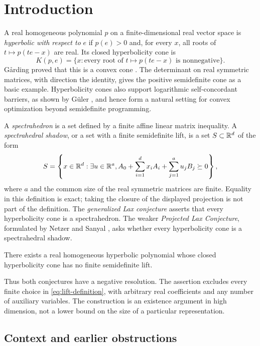\section{Introduction}

A real homogeneous polynomial $p$ on a finite-dimensional real vector
space is \emph{hyperbolic with respect to} $e$ if $p(e)>0$ and, for every
$x$, all roots of $t\mapsto p(te-x)$ are real. Its closed hyperbolicity
cone is
\[
 K(p,e)=\{x:\text{every root of }t\mapsto p(te-x)
                         \text{ is nonnegative}\}.
\]
G\aa rding proved that this is a convex cone \cite{Garding1959}.
The determinant on real symmetric matrices, with direction the identity,
gives the positive semidefinite cone as a basic example. Hyperbolicity
cones also support logarithmic self-concordant barriers, as shown by
G\"uler \cite{Guler1997}, and hence form a natural setting for convex
optimization beyond semidefinite programming.

A \emph{spectrahedron} is a set defined by a finite affine linear matrix
inequality. A \emph{spectrahedral shadow}, or a set with a finite
semidefinite lift, is a set $S\subset\mathbb R^d$ of the form
\begin{equation}\label{eq:lift-definition}
 S=\left\{x\in\mathbb R^d:\exists u\in\mathbb R^a,
 A_0+\sum_{i=1}^d x_iA_i+\sum_{j=1}^a u_jB_j\succeq0\right\},
\end{equation}
where $a$ and the common size of the real symmetric matrices are finite.
Equality in this definition is exact; taking the closure of the displayed
projection is not part of the definition. The \emph{generalized Lax
conjecture} asserts that every hyperbolicity cone is a spectrahedron.
The weaker \emph{Projected Lax Conjecture}, formulated by Netzer and
Sanyal \cite{NetzerSanyal2015}, asks whether every hyperbolicity cone is
a spectrahedral shadow.

\begin{theorem}\label{thm:main}
There exists a real homogeneous hyperbolic polynomial whose closed
hyperbolicity cone has no finite semidefinite lift.
\end{theorem}

Thus both conjectures have a negative resolution. The assertion excludes
every finite choice in \eqref{eq:lift-definition}, with arbitrary real
coefficients and any number of auxiliary variables. The construction is
an existence argument in high dimension, not a lower bound on the size
of a particular representation.

\subsection{Context and earlier obstructions}

